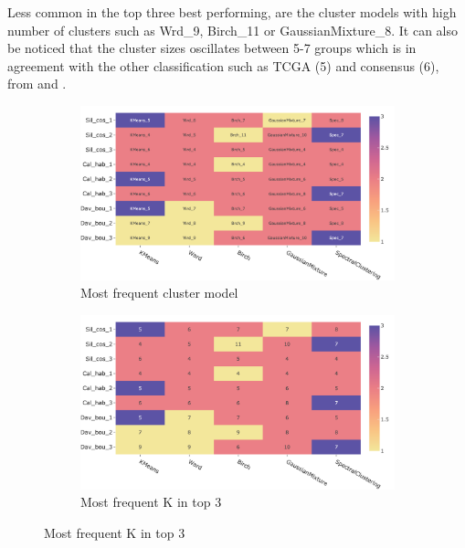 Less common in the top three best performing, are the cluster models with high number of clusters such as Wrd\_9, Birch\_11 or GaussianMixture\_8. It can also be noticed that the cluster sizes oscillates between 5-7 groups which is in agreement with the other classification such as TCGA (5) and consensus (6), from \citet{Robertson2017-mg} and \citet{Kamoun2020-tj}.

\begin{figure}[H]
    \centering
    \small
    \begin{subfigure}[!t]{1.0\textwidth}
        \includegraphics[width=\textwidth]{Sections/ClusteringAnalysis/Resources/cs_top3/top3_cs_gen_top3_heatmap_pca.png}
        \caption{Most frequent cluster model}
        \label{fig:cs:heatmap_gen}
    \end{subfigure}
    \centering
    \begin{subfigure}[!t]{1.0\textwidth}
        \includegraphics[width=\textwidth]{Sections/ClusteringAnalysis/Resources/cs_top3/top3_cs_size_top3_heatmap_pca.png}
        \caption{Most frequent K in top 3}
        \label{fig:cs:heatmap_cs}
    \end{subfigure}

\end{figure}
